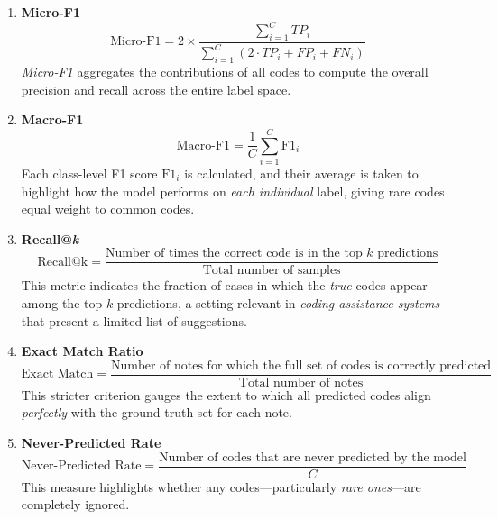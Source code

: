 \begin{enumerate}
    \item \textbf{Micro-F1}
    \begin{equation}
        \text{Micro-F1} = 2 \times 
        \frac{\sum_{i=1}^{C} TP_{i}}
        {\sum_{i=1}^{C} (2 \cdot TP_{i} + FP_{i} + FN_{i})}
    \end{equation}
    \emph{Micro-F1} aggregates the contributions of all codes to compute the overall precision and recall across the entire label space.

    \item \textbf{Macro-F1}
    \begin{equation}
        \text{Macro-F1} = \frac{1}{C} \sum_{i=1}^{C} \text{F1}_{i}
    \end{equation}
    Each class-level F1 score $\text{F1}_{i}$ is calculated, and their average is taken to highlight how the model performs on \emph{each individual} label, giving rare codes equal weight to common codes.

    \item \textbf{Recall@\emph{k}}
    \begin{equation}
        \text{Recall@k} = 
        \frac{\text{Number of times the correct code is in the top } k \text{ predictions}}
        {\text{Total number of samples}}
    \end{equation}
    This metric indicates the fraction of cases in which the \emph{true} codes appear among the top $k$ predictions, a setting relevant in \emph{coding-assistance systems} that present a limited list of suggestions.

    \item \textbf{Exact Match Ratio}
    \begin{equation}
        \text{Exact Match} = 
        \frac{\text{Number of notes for which the full set of codes is correctly predicted}}
        {\text{Total number of notes}}
    \end{equation}
    This stricter criterion gauges the extent to which all predicted codes align \emph{perfectly} with the ground truth set for each note.

    \item \textbf{Never-Predicted Rate}
    \begin{equation}
        \text{Never-Predicted Rate} = 
        \frac{\text{Number of codes that are never predicted by the model}}{C}
    \end{equation}
    This measure highlights whether any codes---particularly \emph{rare ones}---are completely ignored.
\end{enumerate}

